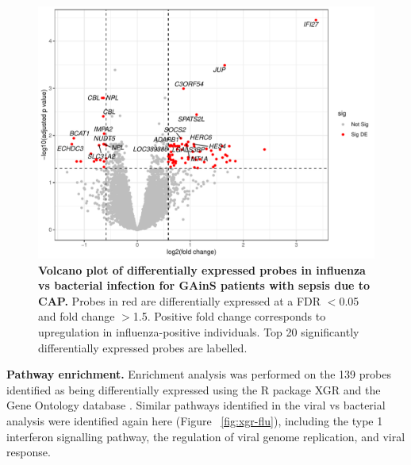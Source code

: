 \FloatBarrier
\begin{figure}[htbp]
\centering
\includegraphics[width=\textwidth]{./Results3/Images/vp-flu.pdf}
\caption[Volcano plot of differentially expressed probes in influenza infection]{\textbf{Volcano plot of differentially expressed probes in influenza vs bacterial infection for GAinS patients with sepsis due to CAP.} Probes in red are differentially expressed at a FDR $<$0.05 and fold change $>$1.5. Positive fold change corresponds to upregulation in influenza-positive individuals. Top 20 significantly differentially expressed probes are labelled.}
\label{fig:vp-flu}
\end{figure}
\FloatBarrier

\textbf{Pathway enrichment.} Enrichment analysis was performed on the 139 probes identified as being differentially expressed using the R package XGR \parencite{Fang2016} and the Gene Ontology database \parencite{GO2019} \parencite{Ashburner2000}. Similar pathways identified in the viral vs bacterial analysis were identified again here (Figure ~\ref{fig:xgr-flu}), including the type 1 interferon signalling pathway, the regulation of viral genome replication, and viral response.


